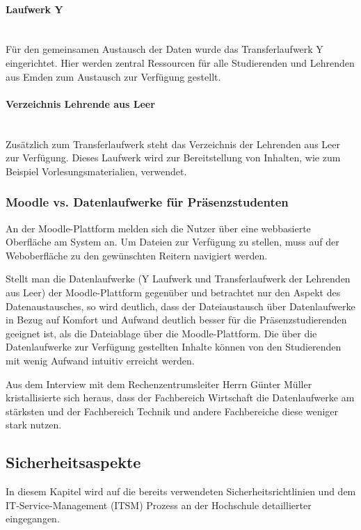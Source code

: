 \paragraph{Laufwerk Y}\mbox{} \\

Für den gemeinsamen Austausch der Daten wurde das Transferlaufwerk Y eingerichtet. Hier werden zentral Ressourcen für alle Studierenden und Lehrenden aus Emden zum Austausch zur Verfügung gestellt.

\paragraph{Verzeichnis Lehrende aus Leer}\mbox{} \\

Zusätzlich zum Transferlaufwerk steht das Verzeichnis der Lehrenden aus Leer  zur Verfügung. Dieses Laufwerk wird zur Bereitstellung von Inhalten, wie zum Beispiel Vorlesungsmaterialien, verwendet.

\subsubsection{Moodle vs. Datenlaufwerke für Präsenzstudenten}
An der Moodle-Plattform melden sich die Nutzer über eine webbasierte Oberfläche am System an. Um Dateien zur Verfügung zu stellen, muss auf der Weboberfläche zu den gewünschten Reitern navigiert werden.

Stellt man die Datenlaufwerke (Y Laufwerk und Transferlaufwerk der Lehrenden aus Leer) der Moodle-Plattform gegenüber und betrachtet nur den Aspekt des Datenaustausches, so wird deutlich, dass der Dateiaustausch über   Datenlaufwerke in Bezug auf Komfort und Aufwand deutlich besser für die Präsenzstudierenden geeignet ist, als die Dateiablage über die Moodle-Plattform. Die über die Datenlaufwerke zur Verfügung gestellten Inhalte können von den Studierenden mit wenig Aufwand intuitiv erreicht werden.

Aus dem Interview mit dem Rechenzentrumsleiter Herrn Günter Müller kristallisierte sich heraus, dass der Fachbereich Wirtschaft die Datenlaufwerke am stärksten und der Fachbereich Technik und andere Fachbereiche diese weniger stark nutzen.

\subsection{Sicherheitsaspekte}
In diesem Kapitel wird auf die bereits verwendeten Sicherheitsrichtlinien und dem IT-Service-Management (ITSM) Prozess an der Hochschule detaillierter eingegangen.

